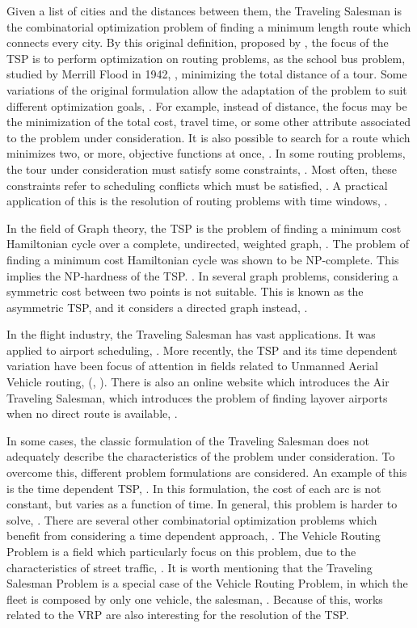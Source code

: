 Given a list of cities and the distances between them, the Traveling Salesman is the combinatorial optimization problem of finding a minimum length route which connects every city.  
By this original definition, proposed by \cite{cite_1}, the focus of the TSP is to perform optimization on routing problems, 
as the school bus problem, studied by Merrill Flood in 1942, \cite{cite_2}, minimizing the total distance of a tour. 
Some variations of the original formulation allow the adaptation of the problem to suit different optimization goals, \cite{cite_3}. 
For example, instead of distance, the focus may be the minimization of the total cost, travel time, or some other attribute associated to the problem under consideration. 
It is also possible to search for a route which minimizes two, or more, objective functions at once, \cite{cite_4}.  
In some routing problems, the tour under consideration must satisfy some constraints, \cite{cite_8}. 
Most often, these constraints refer to scheduling conflicts which must be satisfied, \cite{cite_9}. 
A practical application of this is the resolution of routing problems with time windows, \cite{cite_10}.

In the field of Graph theory, the TSP is the problem of finding a minimum cost Hamiltonian cycle over a complete, undirected, weighted graph, \cite{cite_5}. 
The problem of finding a minimum cost Hamiltonian cycle was shown to be NP-complete. This implies the NP-hardness of the TSP. \cite{cite_6}. 
In several graph problems, considering a symmetric cost between two points is not suitable. This is known as the asymmetric TSP, and it considers a directed graph instead, \cite{cite_7}.

In the flight industry, the Traveling Salesman has vast applications. It was applied to airport scheduling, \cite{cite_14}. 
More recently, the TSP and its time dependent variation have been focus of attention in fields related to Unmanned Aerial Vehicle routing, (\cite{cite_16}, \cite{cite_17}). 
There is also an online website which introduces the Air Traveling Salesman, which introduces the problem of finding layover airports when no direct route is available, \cite{cite_15}.

In some cases, the classic formulation of the Traveling Salesman does not adequately describe the characteristics of the problem under consideration. 
To overcome this, different problem formulations are considered. An example of this is the time dependent TSP, \cite{cite_12}. 
In this formulation, the cost of each arc is not constant, but varies as a function of time. 
In general, this problem is harder to solve, \cite{cite_21}. 
There are several other combinatorial optimization problems which benefit from considering a time dependent approach, \cite{cite_20}. 
The Vehicle Routing Problem is a field which particularly focus on this problem, due to the characteristics of street traffic, \cite{cite_19}. 
It is worth mentioning that the Traveling Salesman Problem is a special case of the Vehicle Routing Problem, in which the fleet is composed by only one vehicle, the salesman, \cite{cite_19}. 
Because of this, works related to the VRP are also interesting for the resolution of the TSP.

